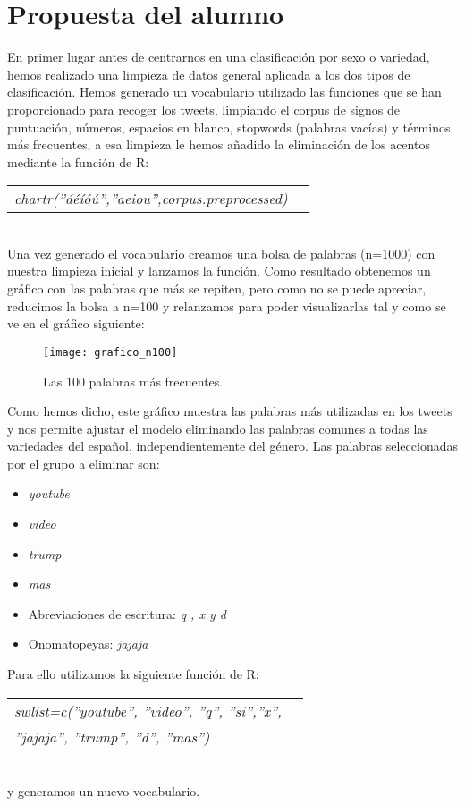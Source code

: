 \documentclass[11pt,a4paper]{article}
\begin{document}
\section{Propuesta del alumno}

En primer lugar antes de centrarnos en una clasificación por sexo o variedad, hemos realizado una limpieza de datos general aplicada a los dos tipos de clasificación. 
Hemos generado un vocabulario utilizado las funciones que se han proporcionado para recoger los tweets, limpiando el corpus de signos de puntuación, números, espacios en blanco, stopwords (palabras vacías) y términos más frecuentes, a esa limpieza le hemos añadido la eliminación de los acentos mediante la función de R:
\begin{tabular}{ l c }
{\em chartr(”áéíóú”,”aeiou”,corpus.preprocessed)} \\
\end{tabular}\\
Una vez generado el vocabulario creamos una bolsa de palabras (n=1000) con nuestra limpieza inicial y lanzamos la función. Como resultado obtenemos un gráfico con las palabras que más se repiten, pero como no se puede apreciar, reducimos la bolsa a n=100 y relanzamos para poder visualizarlas tal y como se ve en el gráfico siguiente:

\begin{figure}[htb]
\centering
\texttt{[image: grafico\_n100]}
\caption{Las 100 palabras más frecuentes.} \label{fig:grafico_n100}
\end{figure}

 Como hemos dicho, este gráfico muestra las palabras más utilizadas en los tweets y nos permite ajustar el modelo eliminando las palabras comunes a todas las variedades del español, independientemente del género.
 Las palabras seleccionadas por el grupo a eliminar son:

\begin{itemize}
  \item {\em youtube}
  \item {\em video}
  \item {\em trump}
  \item {\em mas}
  \item Abreviaciones de escritura: {\em q , x y d}
  \item Onomatopeyas: {\em jajaja}
\end{itemize}

Para ello utilizamos la siguiente función de R:
\begin{tabular}{ l c }
{\em swlist=c(”youtube”, ”video”, ”q”, ”si”,”x”,}\\
{\em”jajaja”, ”trump”, ”d”, ”mas”)} \\
\end{tabular}\\
y generamos un nuevo vocabulario.
\end{document}
